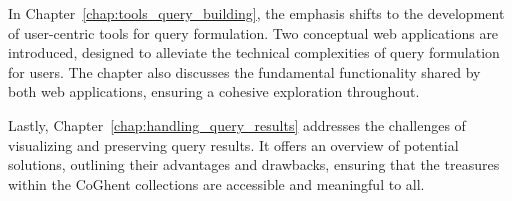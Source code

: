 In Chapter~\ref{chap:tools_query_building}, the emphasis shifts to the development of user-centric tools for query formulation. Two conceptual web applications are introduced, designed to alleviate the technical complexities of query formulation for users. The chapter also discusses the fundamental functionality shared by both web applications, ensuring a cohesive exploration throughout.

Lastly, Chapter~\ref{chap:handling_query_results} addresses the challenges of visualizing and preserving query results. It offers an overview of potential solutions, outlining their advantages and drawbacks, ensuring that the treasures within the CoGhent collections are accessible and meaningful to all.